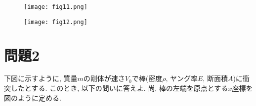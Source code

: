 \documentclass[12pt]{jsarticle}
\begin{document}
\begin{figure}[htbp]
 \begin{minipage}{0.5\hsize}
  \begin{center}
   \texttt{[image: fig11.png]}
   \caption{}   
  \end{center}
  \label{fig:one}
 \end{minipage}
 \begin{minipage}{0.5\hsize}
  \begin{center}
   \texttt{[image: fig12.png]}
   \caption{}   
  \end{center}
  \label{fig:two}
 \end{minipage}
\end{figure}
\newpage
\section*{問題2}
下図に示すように, 質量$m$の剛体が速さ$V_0$で棒(密度$\rho$, ヤング率$E$, 断面積$A$)に衝突したとする. このとき, 以下の問いに答えよ. 尚, 棒の左端を原点とする$x$座標を図のように定める.
\end{document}
